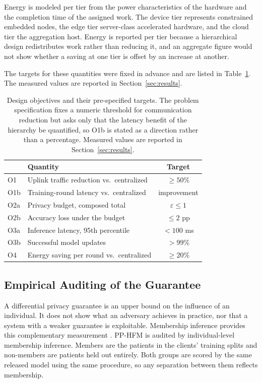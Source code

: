 Energy is modeled per tier from the power characteristics of the hardware and
the completion time of the assigned work. The device tier represents
constrained embedded nodes, the edge tier server-class accelerated hardware,
and the cloud tier the aggregation host. Energy is reported per tier because a
hierarchical design redistributes work rather than reducing it, and an
aggregate figure would not show whether a saving at one tier is offset by an
increase at another.

The targets for these quantities were fixed in advance and are listed in
Table~\ref{tab:objectives}. The measured values are reported in
Section~\ref{sec:results}.

\begin{table}[!t]
\centering
\caption{Design objectives and their pre-specified targets. The problem
specification fixes a numeric threshold for communication reduction but asks
only that the latency benefit of the hierarchy be quantified, so O1b is stated
as a direction rather than a percentage. Measured values are reported in
Section~\ref{sec:results}.}
\label{tab:objectives}
\begin{tabular}{llc}
\toprule
& Quantity & Target \\
\midrule
O1  & Uplink traffic reduction vs.\ centralized & $\ge 50\%$ \\
O1b & Training-round latency vs.\ centralized   & improvement \\
O2a & Privacy budget, composed total            & $\varepsilon \le 1$ \\
O2b & Accuracy loss under the budget            & $\le 2$ pp \\
O3a & Inference latency, 95th percentile        & $< 100$ ms \\
O3b & Successful model updates                  & $> 99\%$ \\
O4  & Energy saving per round vs.\ centralized  & $\ge 20\%$ \\
\bottomrule
\end{tabular}
\end{table}

\subsection{Empirical Auditing of the Guarantee}
\label{sec:method:mia}

A differential privacy guarantee is an upper bound on the influence of an
individual. It does not show what an adversary achieves in practice, nor that a
system with a weaker guarantee is exploitable. Membership inference provides
this complementary measurement \cite{ref14}. PP-HFM is audited by
individual-level membership inference. Members are the patients in the
clients' training splits and non-members are patients held out entirely. Both
groups are scored by the same released model using the same procedure, so any
separation between them reflects membership.

